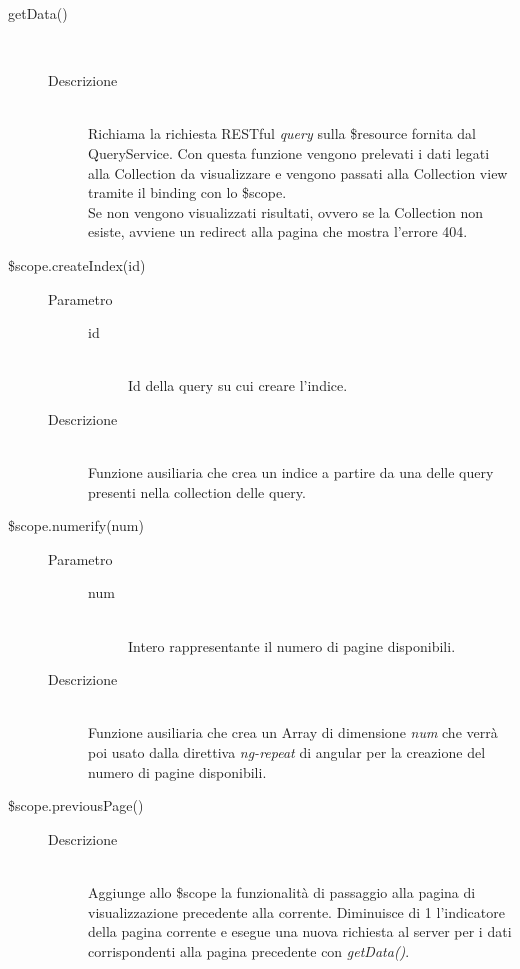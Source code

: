 \begin{description}
\begin{description}
  \item[getData()] \hfill \\
  \begin{description}
  	\item[Descrizione] \hfill \\
  Richiama la richiesta RESTful \textit{query} sulla \$resource fornita dal QueryService.
  Con questa funzione vengono prelevati i dati legati alla Collection da visualizzare e vengono
  passati alla Collection view tramite il binding con lo \$scope. \\
  Se non vengono visualizzati risultati, ovvero se la Collection non esiste, avviene un redirect alla pagina
  che mostra l'errore 404.
  \end{description}
  
    \item[\$scope.createIndex(id)] \hfill
    \begin{description}
  	\item[Parametro] \hfill
  		\begin{description}
  			\item[id] \hfill \\
  			Id della query su cui creare l'indice.
       \end{description}
  	\item[Descrizione] \hfill \\
  Funzione ausiliaria che crea un indice a partire da una delle query presenti nella collection delle query.

    \end{description}
  
  \item[\$scope.numerify(num)] \hfill
   \begin{description}
  	\item[Parametro] \hfill
  		\begin{description}
  			\item[num] \hfill \\
  			Intero rappresentante il numero di pagine disponibili.
       \end{description}
  	\item[Descrizione] \hfill \\
 Funzione ausiliaria che crea un Array di dimensione \textit{num} che verrà poi usato dalla direttiva \textit{ng-repeat} di angular per la creazione del numero di pagine disponibili.
    \end{description}
 
  
  \item[\$scope.previousPage()] \hfill
  \begin{description}
  	\item[Descrizione] \hfill \\  
  Aggiunge allo \$scope la funzionalità di passaggio alla pagina di visualizzazione precedente alla corrente.
  Diminuisce di 1 l'indicatore della pagina corrente e esegue una nuova richiesta al server per i dati corrispondenti alla pagina precedente con \textit{getData()}.
    \end{description}


\end{description}
\end{description}
